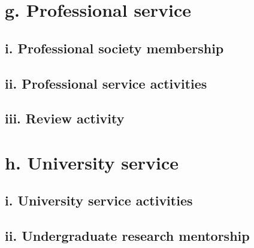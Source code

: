 \documentclass{article}
\begin{document}



\section*{g. Professional service}

\subsection*{i. Professional society membership}



\subsection*{ii. Professional service activities}



\subsection*{iii. Review activity}




\section*{h. University service}

\subsection*{i. University service activities}



\subsection*{ii. Undergraduate research mentorship}


\end{document}
